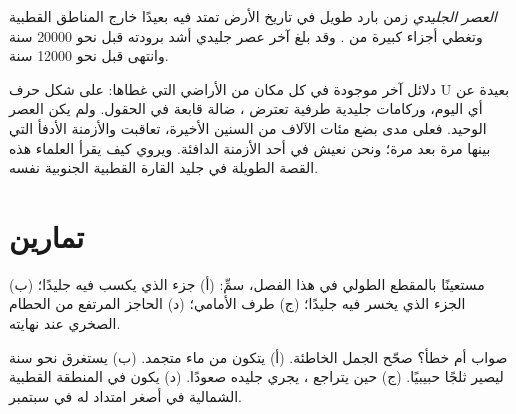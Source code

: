 \begin{definition}\label{def:g8:ice-on-earth:ice-age}
\emph{العصر الجليدي} زمن بارد طويل في تاريخ الأرض تمتد فيه
 بعيدًا خارج المناطق القطبية وتغطي أجزاء كبيرة من .
وقد بلغ آخر عصر جليدي أشد برودته قبل نحو \num{20000} سنة وانتهى قبل نحو
\num{12000} سنة.
\end{definition}

دلائل آخر  موجودة في كل مكان من الأراضي التي غطاها:  على شكل
حرف U بعيدة عن أي  اليوم، وركامات جليدية طرفية تعترض ، 
ضالة قابعة في الحقول. ولم يكن العصر الوحيد. فعلى مدى بضع مئات الآلاف من السنين
الأخيرة، تعاقبت  والأزمنة الأدفأ التي بينها مرة بعد مرة؛ ونحن
نعيش في أحد الأزمنة الدافئة. ويروي  كيف
يقرأ العلماء هذه القصة الطويلة في جليد القارة القطبية الجنوبية
نفسه.

\section{تمارين}

\begin{exercise}[$\star$]\label{exo:g8:ice-on-earth:1}
مستعينًا بالمقطع الطولي  في هذا الفصل، سمِّ: (أ) جزء  الذي يكسب فيه جليدًا؛ (ب) الجزء الذي يخسر فيه جليدًا؛ (ج) طرف  الأمامي؛ (د) الحاجز المرتفع من الحطام الصخري عند نهايته.
\end{exercise}

\begin{exercise}[$\star$]\label{exo:g8:ice-on-earth:2}
صواب أم خطأ؟ صحّح الجمل الخاطئة. (أ) يتكون  من ماء 
متجمد. (ب) يستغرق  نحو سنة ليصير ثلجًا حبيبيًا. (ج) حين يتراجع ، يجري جليده صعودًا. (د) يكون  في المنطقة القطبية الشمالية
في أصغر امتداد له في سبتمبر.
\end{exercise}

